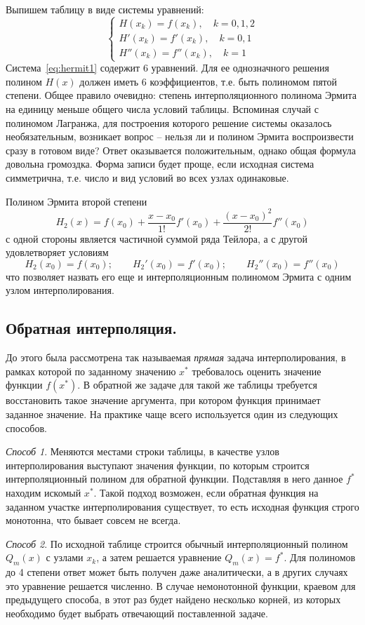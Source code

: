 Выпишем таблицу в виде системы уравнений:
\begin{equation}
    \begin{cases}
        H(x_k) = f(x_k), \quad k = 0, 1, 2 \\
        H'(x_k) = f'(x_k), \quad k = 0, 1 \\
        H''(x_k) = f''(x_k), \quad k = 1
    \end{cases}
    \label{eq:hermit1}
\end{equation}
Система~\eqref{eq:hermit1} содержит 6 уравнений. Для ее однозначного решения полином $H(x)$
должен иметь 6 коэффициентов, т.е. быть полиномом пятой степени. Общее правило очевидно:
степень интерполяционного полинома Эрмита на единицу меньше общего числа условий таблицы.
Вспоминая случай с полиномом Лагранжа, для построения которого решение системы оказалось
необязательным, возникает вопрос -- нельзя ли и полином Эрмита воспроизвести сразу в готовом
виде? Ответ оказывается положительным, однако общая формула довольна громоздка. Форма записи
будет проще, если исходная система симметрична, т.е. число и вид условий во всех узлах
одинаковые.

Полином Эрмита второй степени
\begin{equation*}
    H_2(x) = f(x_0) + \frac{x - x_0}{1!}f'(x_0) + \frac{\left( x - x_0 \right)^2}{2!}f''(x_0)
\end{equation*}
с одной стороны является частичной суммой ряда Тейлора, а с другой удовлетворяет условиям
\begin{equation*}
    H_2(x_0) = f(x_0); \qquad H_2'(x_0) = f'(x_0); \qquad H_2''(x_0) = f''(x_0)
\end{equation*}
что позволяет назвать его еще и интерполяционным полиномом Эрмита с одним узлом интерполирования.

\subsection{Обратная интерполяция.}
До этого была рассмотрена так называемая \emph{прямая} задача интерполирования, в рамках которой
по заданному значению $x^{*}$ требовалось оценить значение функции $f(x^{*})$. В обратной же задаче
для такой же таблицы требуется восстановить такое значение аргумента, при котором функция принимает
заданное значение. На практике чаще всего используется один из следующих способов.

\emph{Способ 1}. Меняются местами строки таблицы, в качестве узлов интерполирования выступают
значения функции, по которым строится интерполяционный полином для обратной функции. Подставляя
в него данное $f^{*}$ находим искомый $x^{*}$. Такой подход возможен, если обратная функция на
заданном участке интерполирования существует, то есть исходная функция строго монотонна, что
бывает совсем не всегда.

\emph{Способ 2}. По исходной таблице строится обычный интерполяционный полином $Q_m(x)$ с
узлами $x_k$, а затем решается уравнение $Q_m(x) = f^{*}$. Для полиномов до 4 степени
ответ может быть получен даже аналитически, а в других случаях это уравнение решается численно.
В случае немонотонной функции, краевом для предыдущего способа, в этот раз будет найдено несколько
корней, из которых необходимо будет выбрать отвечающий поставленной задаче.
